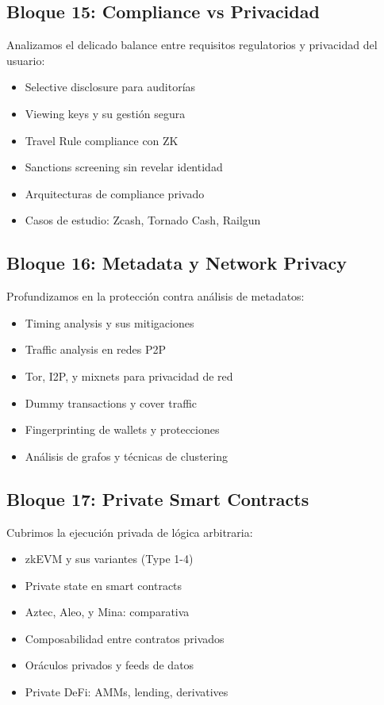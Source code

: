 \documentclass[11pt,a4paper,twoside]{book}
\theoremstyle{definition}
\theoremstyle{remark}
\begin{document}
\subsection*{Bloque 15: Compliance vs Privacidad}
Analizamos el delicado balance entre requisitos regulatorios y privacidad del usuario:
\begin{itemize}
    \item Selective disclosure para auditorías
    \item Viewing keys y su gestión segura
    \item Travel Rule compliance con ZK
    \item Sanctions screening sin revelar identidad
    \item Arquitecturas de compliance privado
    \item Casos de estudio: Zcash, Tornado Cash, Railgun
\end{itemize}

\subsection*{Bloque 16: Metadata y Network Privacy}
Profundizamos en la protección contra análisis de metadatos:
\begin{itemize}
    \item Timing analysis y sus mitigaciones
    \item Traffic analysis en redes P2P
    \item Tor, I2P, y mixnets para privacidad de red
    \item Dummy transactions y cover traffic
    \item Fingerprinting de wallets y protecciones
    \item Análisis de grafos y técnicas de clustering
\end{itemize}

\subsection*{Bloque 17: Private Smart Contracts}
Cubrimos la ejecución privada de lógica arbitraria:
\begin{itemize}
    \item zkEVM y sus variantes (Type 1-4)
    \item Private state en smart contracts
    \item Aztec, Aleo, y Mina: comparativa
    \item Composabilidad entre contratos privados
    \item Oráculos privados y feeds de datos
    \item Private DeFi: AMMs, lending, derivatives
\end{itemize}
\end{document}
